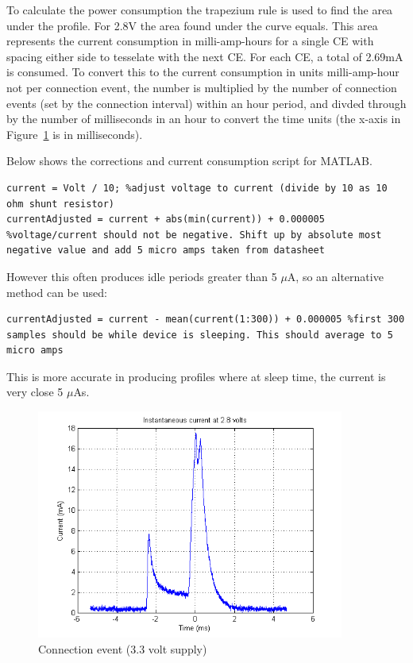 \documentclass[]{article}
\begin{document}
To calculate the power consumption the trapezium rule is used to find the area under the profile. For 2.8V the area found under the curve equals. This area represents the current consumption in milli-amp-hours for a single \ac{CE} with spacing either side to tesselate with the next \ac{CE}. For each \ac{CE}, a total of 2.69mA is consumed.  To convert this to the current consumption in units milli-amp-hour not per connection event, the number is multiplied by the number of connection events (set by the connection interval) within an hour period, and divded through by the number of milliseconds in an hour to convert the time units (the x-axis in Figure~\ref{fig:icur2.8} is in milliseconds). 

Below shows the corrections and current consumption script for MATLAB. 

\begin{lstlisting}
current = Volt / 10; %adjust voltage to current (divide by 10 as 10 ohm shunt resistor)
currentAdjusted = current + abs(min(current)) + 0.000005 %voltage/current should not be negative. Shift up by absolute most negative value and add 5 micro amps taken from datasheet
\end{lstlisting}

However this often produces idle periods greater than 5 $\mu$A, so an alternative method can be used:

\begin{lstlisting}
currentAdjusted = current - mean(current(1:300)) + 0.000005 %first 300 samples should be while device is sleeping. This should average to 5 micro amps
\end{lstlisting}

This is more accurate in producing profiles where at sleep time, the current is very close 5 $\mu$As.

\begin{figure}[H]
	\begin{center}
		\includegraphics[width = 0.9\textwidth]{icur28}
	\end{center}
	\caption{Connection event (3.3 volt supply)}
	\label{fig:icur2.8}
\end{figure}
\end{document}
